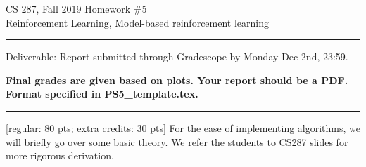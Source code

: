 \documentclass{article}
\newcommand{\ruleskip}{\bigskip\hrule\bigskip}
\begin{document}
\pagestyle{myheadings} 

{\huge
\noindent CS 287, Fall 2019 Homework \#5\\
 Reinforcement Learning, Model-based reinforcement learning}


\ruleskip

Deliverable: Report submitted through Gradescope by Monday Dec 2nd, 23:59.

\textbf{Final grades are given based on plots. Your report should be a PDF. Format specified in PS5\_template.tex.}

\ruleskip


[regular: 80 pts; extra credits: 30 pts]
For the ease of implementing algorithms, we will briefly go over some basic theory. We refer the students to CS287 slides for more rigorous derivation. 
\end{document}
